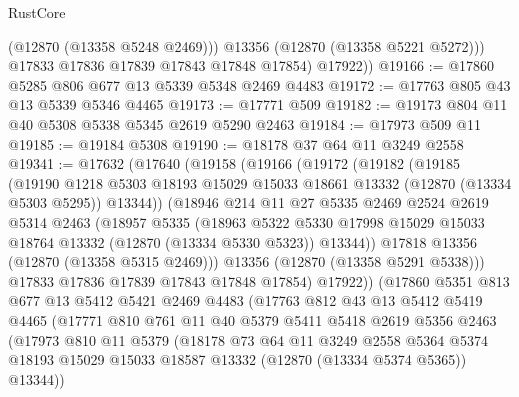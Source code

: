 \begin{lexlean}{RustCore}
\begin{coremodule}
              (@12870 (@13358 @5248 @2469)))
            @13356
            (@12870 (@13358 @5221 @5272)))
          @17833
          @17836
          @17839
          @17843
          @17848
          @17854)
        @17922))
@19166 := @17860 @5285 @806 @677 @13 @5339 @5348 @2469 @4483
@19172 := @17763 @805 @43 @13 @5339 @5346 @4465
@19173 := @17771 @509
@19182 := @19173 @804 @11 @40 @5308 @5338 @5345 @2619 @5290 @2463
@19184 := @17973 @509 @11
@19185 := @19184 @5308
@19190 := @18178 @37 @64 @11 @3249 @2558
@19341 := @17632
    (@17640
      (@19158
        (@19166
          (@19172
            (@19182
              (@19185
                (@19190
                  @1218
                  @5303
                  @18193
                  @15029
                  @15033
                  @18661
                  @13332
                  (@12870 (@13334 @5303 @5295))
                  @13344))
              (@18946
                @214
                @11
                @27
                @5335
                @2469
                @2524
                @2619
                @5314
                @2463
                (@18957
                  @5335
                  (@18963
                    @5322
                    @5330
                    @17998
                    @15029
                    @15033
                    @18764
                    @13332
                    (@12870 (@13334 @5330 @5323))
                    @13344))
                @17818
                @13356
                (@12870 (@13358 @5315 @2469)))
              @13356
              (@12870 (@13358 @5291 @5338)))
            @17833
            @17836
            @17839
            @17843
            @17848
            @17854)
          @17922))
      (@17860
        @5351
        @813
        @677
        @13
        @5412
        @5421
        @2469
        @4483
        (@17763
          @812
          @43
          @13
          @5412
          @5419
          @4465
          (@17771
            @810
            @761
            @11
            @40
            @5379
            @5411
            @5418
            @2619
            @5356
            @2463
            (@17973
              @810
              @11
              @5379
              (@18178
                @73
                @64
                @11
                @3249
                @2558
                @5364
                @5374
                @18193
                @15029
                @15033
                @18587
                @13332
                (@12870 (@13334 @5374 @5365))
                @13344))

\end{coremodule}
\end{lexlean}
